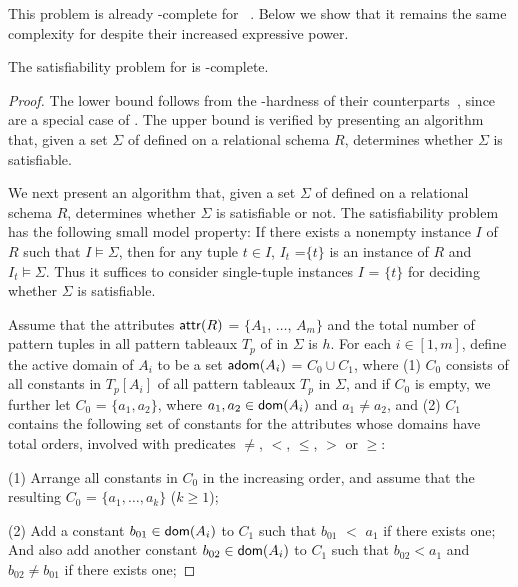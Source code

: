 This problem is already \NP-complete for \CFDs~\cite{CFDs}.
Below we show that it remains the
same complexity for \pCFDs despite their increased
expressive power.

\begin{prop}
\label{thm-sat-pcfd-fin} The satisfiability problem for \pCFDs is
\NP-complete.
\end{prop}

\begin{proof} The lower bound follows from the \NP-hardness of their \CFDs
counterparts~\cite{CFDs}, since \CFDs are a special case of \pCFDs.
The upper bound is verified by presenting an \NP algorithm that,
given a set $\Sigma$ of \pCFDs defined on a relational schema $R$,
determines whether $\Sigma$ is satisfiable. 

We next present an \NP
algorithm that, given a set $\Sigma$ of \pCFDs defined on a
relational schema $R$, determines whether $\Sigma$ is satisfiable or not.
The satisfiability problem has the following small model property:
If there exists a nonempty instance $I$ of $R$ such that
$I\models\Sigma$, then for any tuple $t\in I$, $I_t$ =$\{t\}$ is an
instance of $R$ and $I_t\models\Sigma$. Thus it suffices to consider
single-tuple instances $I$ = $\{t\}$ for deciding whether $\Sigma$
is satisfiable.

Assume \kwlog that the attributes $\protect\mathsf{attr}(R)$ = $\{A_1$, $\dots$,
$A_m\}$ and the total number of pattern tuples in all pattern
tableaux $T_p$ of \pCFDs in $\Sigma$ is $h$. For each $i\in [1, m]$, define
the active domain of $A_i$ to be a set ${\mathsf{adom}}(A_i)$ = $C_0\cup C_1$,
where (1) $C_0$ consists of all constants in $T_p[A_i]$ of all
pattern tableaux $T_p$ in $\Sigma$, and if $C_0$ is empty, we further let $C_0$ = $\{a_1, a_2\}$, where
$a_1, a_2 \in\protect\mathsf{dom}(A_i)$ and $a_1\ne a_2$, and (2) $C_1$ contains the
following set of constants for the attributes whose domains have
total orders, \ie involved with predicates $\ne$, $<$, $\le$, $>$ or $\ge$: 


\bi
\item[(1)] Arrange all constants in $C_0$ in the increasing order, and
assume that the resulting $C_0$ = $\{a_1, \ldots, a_k\}$ ($k\ge 1$);

\item[(2)] Add a constant $b_{01}\in\protect\mathsf{dom}(A_i)$ to $C_1$ such that $b_{01}$ $<$ $a_1$ if there
exists one; And also add another constant $b_{02}\in\protect\mathsf{dom}(A_i)$ to $C_1$
such that $b_{02} < a_1$ and $b_{02}\ne b_{01}$ if there exists one;


\end{proof}
